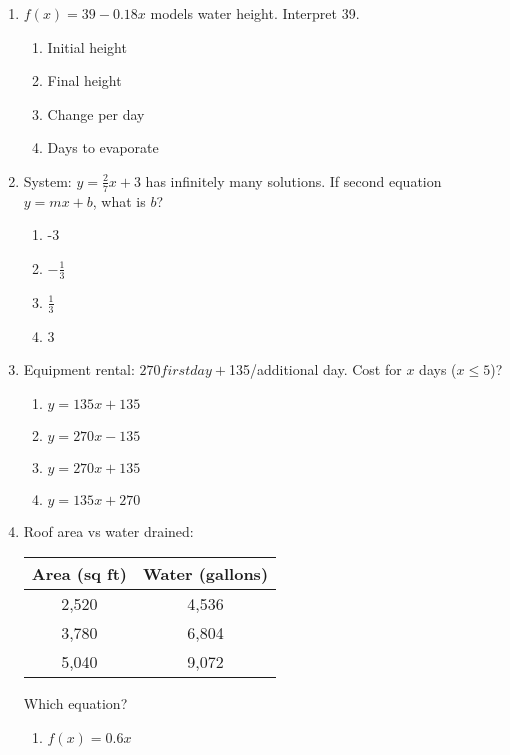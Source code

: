 \documentclass[12pt]{exam}
\begin{document}
\begin{enumerate}
\begin{center}
\begin{tikzpicture}[scale=0.05]
\end{tikzpicture}
\end{center}
    \item $f(x) = 39 - 0.18x$ models water height. Interpret 39.
    \begin{enumerate}[label=\Alph*)]
        \item Initial height
        \item Final height
        \item Change per day
        \item Days to evaporate
    \end{enumerate}
    \item System: $y = \frac{2}{7}x + 3$ has infinitely many solutions. If second equation $y = mx + b$, what is $b$?
    \begin{enumerate}[label=\Alph*)]
        \item -3
        \item $-\frac{1}{3}$
        \item $\frac{1}{3}$
        \item 3
    \end{enumerate}
    \item Equipment rental: $270 first day + $135/additional day. Cost for $x$ days ($x \leq 5$)?
    \begin{enumerate}[label=\Alph*)]
        \item $y = 135x + 135$
        \item $y = 270x - 135$
        \item $y = 270x + 135$
        \item $y = 135x + 270$
    \end{enumerate}
    \item Roof area vs water drained:
    \begin{center}
        \begin{tabular}{|c|c|}
            \hline
            Area (sq ft) & Water (gallons) \\
            \hline
            2,520 & 4,536 \\
            3,780 & 6,804 \\
            5,040 & 9,072 \\
            \hline
        \end{tabular}
    \end{center}
    Which equation?
    \begin{enumerate}[label=\Alph*)]
        \item $f(x) = 0.6x$

\end{enumerate}
\end{enumerate}
\end{document}
